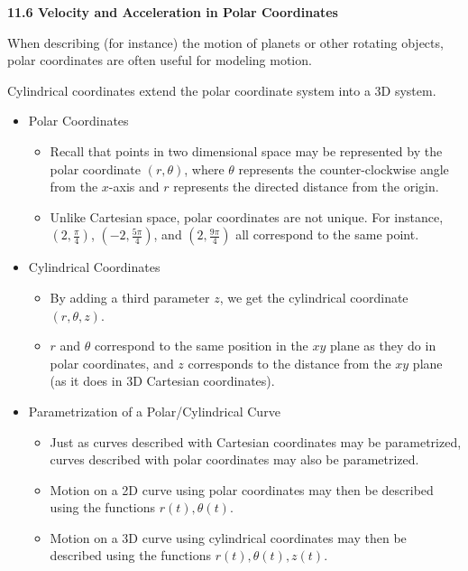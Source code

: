 \documentclass[12pt]{article}
\newcommand{\<}{\left<}
\renewcommand{\>}{\right>}
\begin{document}
  \newpage
  
  \centerline{\bf 11.6 Velocity and Acceleration in Polar Coordinates}
  
  When describing (for instance) the motion of planets or other rotating objects, polar coordinates are often useful for modeling motion.
  
  Cylindrical coordinates extend the polar coordinate system into a 3D system.
  
  \begin{itemize}
  
  \item Polar Coordinates
  
    \begin{itemize}
    \item Recall that points in two dimensional space may be represented by the polar coordinate $(r,\theta)$, where $\theta$ represents the counter-clockwise angle from the $x$-axis and $r$ represents the directed distance from the origin.
    \item Unlike Cartesian space, polar coordinates are not unique. For instance, $(2,\frac{\pi}{4})$, $(-2,\frac{5\pi}{4})$, and $(2,\frac{9\pi}{4})$ all correspond to the same point.
    \end{itemize}
    
  \item Cylindrical Coordinates
  
    \begin{itemize}
    \item By adding a third parameter $z$, we get the cylindrical coordinate $(r,\theta,z)$.
    \item $r$ and $\theta$ correspond to the same position in the $xy$ plane as they do in polar coordinates, and $z$ corresponds to the distance from the $xy$ plane (as it does in 3D Cartesian coordinates).
    \end{itemize}
    
  \item Parametrization of a Polar/Cylindrical Curve
  
    \begin{itemize}
    \item Just as curves described with Cartesian coordinates may be parametrized, curves described with polar coordinates may also be parametrized.
    \item Motion on a 2D curve using polar coordinates may then be described using the functions $r(t),\theta(t)$.
    \item Motion on a 3D curve using cylindrical coordinates may then be described using the functions $r(t),\theta(t),z(t)$.
    \end{itemize}
    

\end{itemize}
\end{document}
